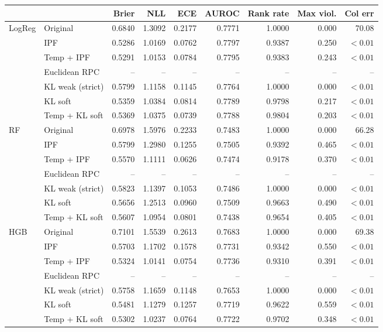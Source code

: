 \begin{tabular}{llrrrrrrr}
\toprule
 &  & Brier & NLL & ECE & AUROC & Rank rate & Max viol. & Col err \\
\midrule
LogReg & Original & 0.6840 & 1.3092 & 0.2177 & 0.7771 & 1.0000 & 0.000 & 70.08 \\
 & IPF & 0.5286 & 1.0169 & 0.0762 & 0.7797 & 0.9387 & 0.250 & $<0.01$ \\
 & Temp + IPF & 0.5291 & 1.0153 & 0.0784 & 0.7795 & 0.9383 & 0.243 & $<0.01$ \\
 & Euclidean RPC & -- & -- & -- & -- & -- & -- & -- \\
 & KL weak (strict) & 0.5799 & 1.1158 & 0.1145 & 0.7764 & 1.0000 & 0.000 & $<0.01$ \\
 & KL soft & 0.5359 & 1.0384 & 0.0814 & 0.7789 & 0.9798 & 0.217 & $<0.01$ \\
 & Temp + KL soft & 0.5369 & 1.0375 & 0.0739 & 0.7788 & 0.9804 & 0.203 & $<0.01$ \\
RF & Original & 0.6978 & 1.5976 & 0.2233 & 0.7483 & 1.0000 & 0.000 & 66.28 \\
 & IPF & 0.5799 & 1.2980 & 0.1255 & 0.7505 & 0.9392 & 0.465 & $<0.01$ \\
 & Temp + IPF & 0.5570 & 1.1111 & 0.0626 & 0.7474 & 0.9178 & 0.370 & $<0.01$ \\
 & Euclidean RPC & -- & -- & -- & -- & -- & -- & -- \\
 & KL weak (strict) & 0.5823 & 1.1397 & 0.1053 & 0.7486 & 1.0000 & 0.000 & $<0.01$ \\
 & KL soft & 0.5656 & 1.2513 & 0.0960 & 0.7509 & 0.9663 & 0.490 & $<0.01$ \\
 & Temp + KL soft & 0.5607 & 1.0954 & 0.0801 & 0.7438 & 0.9654 & 0.405 & $<0.01$ \\
HGB & Original & 0.7101 & 1.5539 & 0.2613 & 0.7683 & 1.0000 & 0.000 & 69.38 \\
 & IPF & 0.5703 & 1.1702 & 0.1578 & 0.7731 & 0.9342 & 0.550 & $<0.01$ \\
 & Temp + IPF & 0.5324 & 1.0141 & 0.0754 & 0.7736 & 0.9310 & 0.391 & $<0.01$ \\
 & Euclidean RPC & -- & -- & -- & -- & -- & -- & -- \\
 & KL weak (strict) & 0.5758 & 1.1659 & 0.1148 & 0.7653 & 1.0000 & 0.000 & $<0.01$ \\
 & KL soft & 0.5481 & 1.1279 & 0.1257 & 0.7719 & 0.9622 & 0.559 & $<0.01$ \\
 & Temp + KL soft & 0.5302 & 1.0237 & 0.0764 & 0.7722 & 0.9702 & 0.348 & $<0.01$ \\

\end{tabular}
